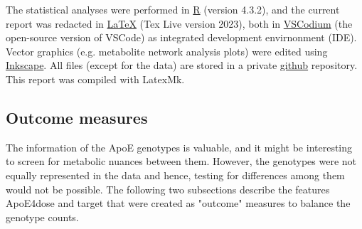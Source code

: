 \documentclass{amsart}
\begin{document}
The statistical analyses were performed in \href{https://www.r-project.org}{\textsf{R}} (version 4.3.2), and the current report was redacted in \href{https://ctan.org/tex}{\LaTeX}  (Tex Live version 2023), both in \href{https://vscodium.com}{\textsf{VSCodium}} (the open-source version of VSCode) as integrated development envirnonment (IDE). Vector graphics (e.g. metabolite network analysis plots) were edited using \href{https://inkscape.org}{\textsf{Inkscape}}. All files (except for the data) are stored in a private \href{https://github.com}{\textsf{github}} repository. This report was compiled with LatexMk.

\newpage \subsection{Outcome measures}\label{featureeng}
The information of the ApoE genotypes is valuable, and it might be interesting to screen for metabolic nuances between them. However, the genotypes were not equally represented in the data and hence, testing for differences among them would not be possible. The following two subsections describe the features ApoE4dose and target that were created as "outcome" measures to balance the genotype counts.
\end{document}
